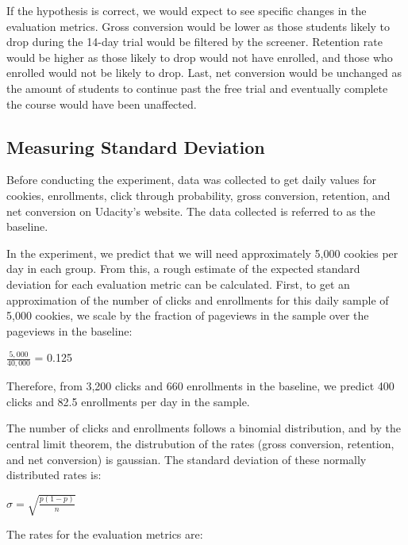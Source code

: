 \documentclass[paper=a4, fontsize=11pt]{scrartcl} %
\numberwithin{equation}{section} %
\numberwithin{figure}{section} %
\numberwithin{table}{section} %
\begin{document}
If the hypothesis is correct, we would expect to see specific changes in the evaluation metrics.  Gross conversion would be lower as those students likely to drop during the 14-day trial would be filtered by the screener.  Retention rate would be higher as those likely to drop would not have enrolled, and those who enrolled would not be likely to drop.  Last, net conversion would be unchanged as the amount of students to continue past the free trial and eventually complete the course would have been unaffected. \newline


\subsection{Measuring Standard Deviation}

Before conducting the experiment, data was collected to get daily values for cookies, enrollments, click through probability, gross conversion, retention, and net conversion on Udacity's website.  The data collected is referred to as the baseline. \newline

In the experiment, we predict that we will need approximately 5,000 cookies per day in each group.  From this, a rough estimate of the expected standard deviation for each evaluation metric can be calculated.  First, to get an approximation of the number of clicks and enrollments for this daily sample of 5,000 cookies, we scale by the fraction of pageviews in the sample over the pageviews in the baseline: \newline

$\frac{5,000}{40,000}$ = 0.125 \newline

Therefore, from 3,200 clicks and 660 enrollments in the baseline, we predict 400 clicks and 82.5 enrollments per day in the sample. \newline

The number of clicks and enrollments follows a binomial distribution, and by the central limit theorem, the distrubution of the rates (gross conversion, retention, and net conversion) is gaussian. The standard deviation of these normally distributed rates is: \newline

$\sigma = \sqrt{\frac{p(1-p)}{n}}$ \newline

The rates for the evaluation metrics are: \newline
\end{document}
